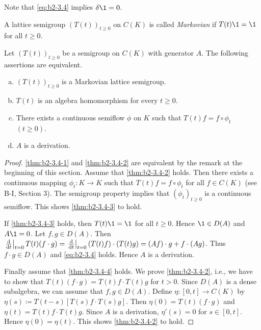 Note that \eqref{eq:b2-3.4} implies $\delta\1 = 0$.

A lattice semigroup $(T(t))_{t \geq 0}$ on $C(K)$ is called \emph{Markovian} if $T(t)\1 = \1$ for all $t \geq 0$.

\begin{theorem}\label{thm:b2-3.4}
Let $(T(t))_{t \geq 0}$ be a semigroup on $C(K)$ with generator $A$.
The following assertions are equivalent.
\begin{enumerate}[(a)]
\item \label{thm:b2-3.4-1}
$(T(t))_{t \geq 0}$ is a Markovian lattice semigroup.
\item \label{thm:b2-3.4-2}
$T(t)$ is an algebra homomorphism for every $t \geq 0$.
\item \label{thm:b2-3.4-3}
There exists a continuous semiflow $\phi$ on $K$ such that $T(t)f = f \circ \phi_{t}$ $(t \geq 0)$.
\item \label{thm:b2-3.4-4}
$A$ is a derivation.
\end{enumerate}
\end{theorem}

\begin{proof}
\ref{thm:b2-3.4-1} and \ref{thm:b2-3.4-2} are equivalent by the remark at the beginning of this section.
Assume that \ref{thm:b2-3.4-2} holds.
Then there exists a continuous mapping $\phi_{t} \colon K \to K$ such that $T(t)f = f \circ \phi_{t}$ for all $f \in C(K)$ (see B-I, Section 3).
The semigroup property implies that $(\phi_{t})_{t \geq 0}$ is a continuous semiflow.
This shows \ref{thm:b2-3.4-3}  to hold.

If \ref{thm:b2-3.4-3} holds, then $T(t)\1 = \1$ for all $t \geq 0$. Hence $\1 \in D(A)$ and $A\1 = 0$.
Let $f,g \in D(A)$.
Then $\left.\frac{\mathop{}\!\mathrm{d}{}}{\mathop{}\!\mathrm{d}{t}}\right|_{t=0} T(t)(f \cdot g) = \left.\frac{\mathop{}\!\mathrm{d}{}}{\mathop{}\!\mathrm{d}{t}}\right|_{t=0} (T(t)f) \cdot (T(t)g) = (Af) \cdot g + f \cdot (Ag)$.
Thus $f \cdot g \in D(A)$ and \eqref{eq:b2-3.4} holds.
Hence $A$ is a derivation.

Finally assume that \ref{thm:b2-3.4-4} holds.
We prove \ref{thm:b2-3.4-2}, i.e., we have to show that $T(t)(f \cdot g) = T(t)f \cdot T(t)g$ for $t > 0$.
Since $D(A)$ is a dense subalgebra, we can assume that $f,g \in D(A)$.
Define $\eta \colon [0,t] \to C(K)$ by $\eta(s) \coloneqq T(t-s)[T(s)f \cdot T(s)g]$.
Then $\eta(0) = T(t)(f \cdot g)$ and $\eta(t) = T(t)f \cdot T(t)g$.
Since $A$ is a derivation, $\eta'(s) = 0$ for $s \in [0,t]$.
Hence $\eta(0) = \eta(t)$.
This shows \ref{thm:b2-3.4-2} to hold.
\end{proof}

